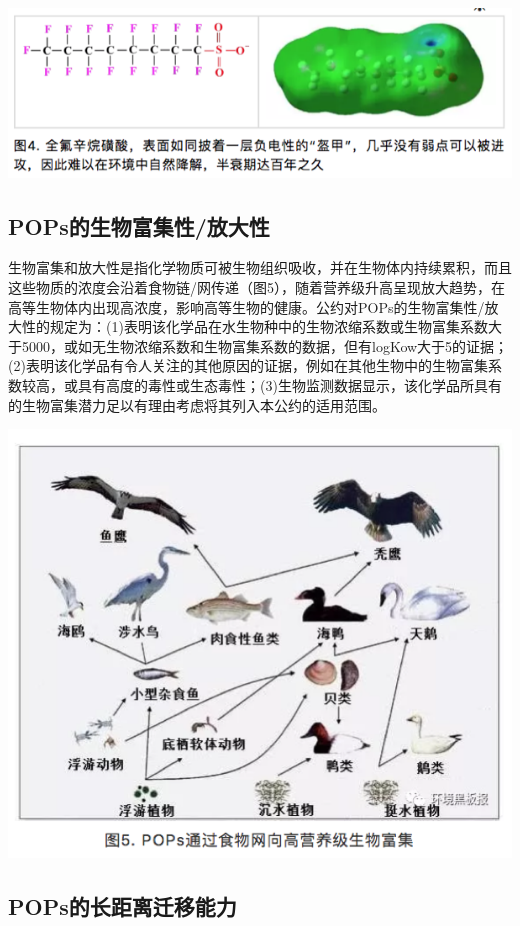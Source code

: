 \documentclass[]{book}
\begin{document}
\includegraphics[width=8.33in]{images/gongyue4}

\subsection{POPs的生物富集性/放大性}\label{pops}

生物富集和放大性是指化学物质可被生物组织吸收，并在生物体内持续累积，而且这些物质的浓度会沿着食物链/网传递（图5），随着营养级升高呈现放大趋势，在高等生物体内出现高浓度，影响高等生物的健康。公约对POPs的生物富集性/放大性的规定为：(1)表明该化学品在水生物种中的生物浓缩系数或生物富集系数大于5000，或如无生物浓缩系数和生物富集系数的数据，但有logKow大于5的证据；(2)表明该化学品有令人关注的其他原因的证据，例如在其他生物中的生物富集系数较高，或具有高度的毒性或生态毒性；(3)生物监测数据显示，该化学品所具有的生物富集潜力足以有理由考虑将其列入本公约的适用范围。

\includegraphics[width=8.33in]{images/gongyue5}

\subsection{POPs的长距离迁移能力}\label{pops}
\end{document}
